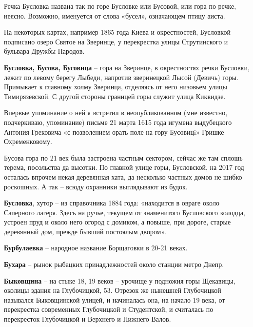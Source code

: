 Речка Бусловка названа так по горе Бусловке или Бусовой, или гора по речке, неясно. Возможно, именуется от слова «бусел», означающем птицу аиста.

На некоторых картах, например 1865 года Киева и окрестностей, Бусловкой подписано озеро Святое на Зверинце, у перекрестка улицы Струтинского и бульвара Дружбы Народов.\\

\medskip

\textbf{Бусловка, Бусова, Бусовица} – гора на Зверинце, в окрестностях речки Бусловки, лежит по левому берегу Лыбеди, напротив зверинецкой Лысой (Девичь) горы. Примыкает к главному холму Зверинца, отделяясь от него низовьем улицы Тимирязевской. С другой стороны границей горы служит улица Киквидзе. 

Впервые упоминание о ней я встретил в неопубликованном (мне известно, подчеркиваю, упоминание) письме 21 марта 1615 года игумена выдубецкого Антония Грековича «с позволением орать поле на гору Бусовицi» Гришке Охременковому.

Бусова гора по 21 век была застроена частным сектором, сейчас же там сплошь терема, посольства да высотки. По главной улице горы, Бусловской, на 2017 год осталась впрочем некая деревянная хата, да несколько частных домов не шибко роскошных. А так – всюду охранники выглядывают из будок.\\ 

\medskip

\textbf{Бусловка}, хутор – из справочника 1884 года: «находится в овраге около Саперного лагеря. Здесь на ручье, текущем от знаменитого Бусловского колодца, устроен пруд и около него огород с домиком, а повыше, при дороге, старые деревянный дом, прежде бывший постоялым двором».\\
\medskip


\textbf{Бурбулаевка} – народное название Борщаговки в 20-21 веках.\\

\medskip


\textbf{Бухара} – рынок рыбацких принадлежностей около станции метро Днепр.\\

\medskip

\textbf{Быковщина} – на стыке 18, 19 веков – урочище у подножия горы Щекавицы, околицы здания на Глубочицкой, 53. Отрезок же нынешней Глубочицкой назывался Быковщинской улицей, и начиналась она, на начало 19 века, от перекрестка современных Глубочицкой и Студентской, и считалась по перекресток Глубочицкой и Верхнего и Нижнего Валов.\\

